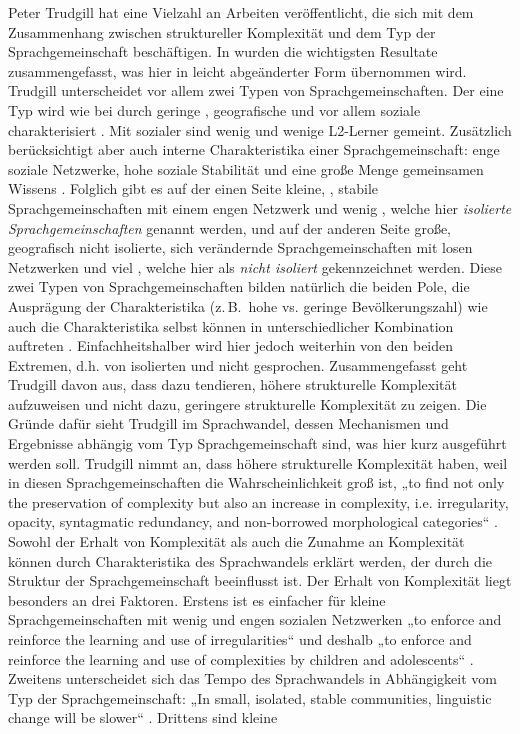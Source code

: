 Peter Trudgill hat eine Vielzahl an Arbeiten veröffentlicht, die sich mit dem Zusammenhang zwischen struktureller Komplexität und dem Typ der Sprachgemeinschaft beschäftigen. In \citet{BaechlerSeiler2016a} wurden die wichtigsten Resultate zusammengefasst, was hier in leicht abgeänderter Form übernommen wird. Trudgill unterscheidet vor allem zwei Typen von Sprachgemeinschaften. Der eine Typ wird wie bei \citet{Braunmüller1984} durch geringe , geografische und vor allem soziale  charakterisiert \citep{Trudgill1992}. Mit sozialer  sind wenig  und wenige L2-Ler\-ner gemeint. Zusätzlich berücksichtigt \citet{Trudgill2011} aber auch interne Charakteristika einer Sprachgemeinschaft: enge soziale Netzwerke, hohe soziale Stabilität und eine große Menge gemeinsamen Wissens \citep[146]{Trudgill2011}. Folglich gibt es auf der einen Seite kleine, , stabile Sprachgemeinschaften mit einem engen Netzwerk und wenig , welche hier \textit{isolierte Sprachgemeinschaften} genannt werden, und auf der anderen Seite große, geografisch nicht isolierte, sich verändernde Sprachgemeinschaften mit losen Netzwerken und viel , welche hier als \textit{nicht isoliert} gekennzeichnet werden. Diese zwei Typen von Sprachgemeinschaften bilden natürlich die beiden Pole, die Ausprägung der Charakteristika (z.\,B.\ hohe vs. geringe Bevölkerungszahl) wie auch die Charakteristika selbst können in unterschiedlicher Kombination auftreten \citep[147]{Trudgill2011}. Einfachheitshalber wird hier jedoch weiterhin von den beiden Extremen, d.h. von isolierten und nicht  gesprochen. Zusammengefasst geht Trudgill davon aus, dass  dazu tendieren, höhere strukturelle Komplexität aufzuweisen und nicht  dazu, geringere strukturelle Komplexität zu zeigen. Die Gründe dafür sieht Trudgill im Sprachwandel, dessen Mechanismen und Ergebnisse abhängig vom Typ Sprachgemeinschaft sind, was hier kurz ausgeführt werden soll. Trudgill nimmt an, dass  höhere strukturelle Komplexität haben, weil in diesen Sprachgemeinschaften die Wahrscheinlichkeit groß ist, „to find not only the preservation of complexity but also an increase in complexity, i.e. irregularity, opacity, syntagmatic redundancy, and non-borrowed morphological categories“ \citep[64]{Trudgill2011}. Sowohl der Erhalt von Komplexität als auch die Zunahme an Komplexität können durch Charakteristika des Sprachwandels erklärt werden, der durch die Struktur der Sprachgemeinschaft beeinflusst ist. Der Erhalt von Komplexität liegt besonders an drei Faktoren. Erstens ist es einfacher für kleine Sprachgemeinschaften mit wenig  und engen sozialen Netzwerken „to enforce and reinforce the learning and use of irregularities“ \citep[204]{Trudgill1992} und deshalb „to enforce and reinforce the learning and use of complexities by children and adolescents“ \citep[13]{Trudgill1996}. Zweitens unterscheidet sich das Tempo des Sprachwandels in Abhängigkeit vom Typ der Sprachgemeinschaft: „In small, isolated, stable communities, linguistic change will be slower“ \citep[103]{Trudgill2011}. Drittens sind kleine 